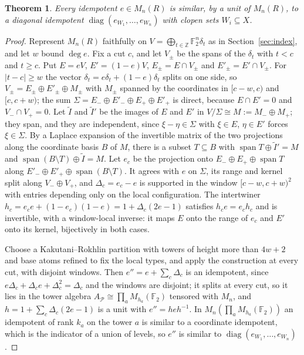 \documentclass[11pt]{amsart}
\newtheorem{theorem}{Theorem}[section]
\theoremstyle{remark}
\newcommand{\F}{\mathbb F}
\newcommand{\Z}{\mathbb Z}
\begin{document}
\begin{theorem}\label{thm:DP}
Every idempotent $e\in M_n(R)$ is similar, by a unit of $M_n(R)$, to a
diagonal idempotent $\operatorname{diag}(e_{W_1},\dots,e_{W_n})$ with
clopen sets $W_i\subseteq X$.
\end{theorem}

\begin{proof}
Represent $M_n(R)$ faithfully on $V=\bigoplus_{t\in\Z}\F_2^n\delta_t$ as in
Section~\ref{sec:index}, and let $w$ bound $\deg e$. Fix a cut $c$, and let
$V_\pm$ be the spans of the $\delta_t$ with $t<c$ and $t\ge c$. Put
$E=eV$, $E'=(1-e)V$, $E_\pm=E\cap V_\pm$ and $E'_\pm=E'\cap V_\pm$. For
$|t-c|\ge w$ the vector $\delta_t=e\delta_t+(1-e)\delta_t$ splits on one
side, so $V_\pm=E_\pm\oplus E'_\pm\oplus M_\pm$ with $M_\pm$ spanned by the
coordinates in $[c-w,c)$ and $[c,c+w)$; the sum
$\Sigma=E_-\oplus E'_-\oplus E_+\oplus E'_+$ is direct, because
$E\cap E'=0$ and $V_-\cap V_+=0$. Let $\tilde I$ and $\tilde I'$ be the
images of $E$ and $E'$ in $V/\Sigma\cong M:=M_-\oplus M_+$; they span, and
they are independent, since $\xi-\eta\in\Sigma$ with $\xi\in E$, $\eta\in E'$
forces $\xi\in\Sigma$. By a Laplace expansion of the invertible matrix of
the two projections along the coordinate basis $B$ of $M$, there is a
subset $T\subseteq B$ with $\operatorname{span}T\oplus\tilde I'=M$ and
$\operatorname{span}(B\setminus T)\oplus\tilde I=M$. Let $e_c$ be the
projection onto $E_-\oplus E_+\oplus\operatorname{span}T$ along
$E'_-\oplus E'_+\oplus\operatorname{span}(B\setminus T)$. It agrees with
$e$ on $\Sigma$, its range and kernel split along $V_-\oplus V_+$, and
$\Delta_c=e_c-e$ is supported in the window $[c-w,c+w)^2$ with entries
depending only on the local configuration. The intertwiner
$h_c=e_ce+(1-e_c)(1-e)=1+\Delta_c(2e-1)$ satisfies $h_ce=e_ch_c$ and is
invertible, with a window-local inverse: it maps $E$ onto the range of
$e_c$ and $E'$ onto its kernel, bijectively in both cases.

Choose a Kakutani--Rokhlin partition with towers of height more than
$4w+2$ and base atoms refined to fix the local types, and apply the
construction at every cut, with disjoint windows. Then $e''=e+\sum_c\Delta_c$
is an idempotent, since $e\Delta_c+\Delta_ce+\Delta_c^2=\Delta_c$ and the
windows are disjoint; it splits at every cut, so it lies in the tower
algebra $A_{\mathcal P}\cong\prod_aM_{h_a}(\F_2)$ tensored with $M_n$, and
$h=1+\sum_c\Delta_c(2e-1)$ is a unit with $e''=heh^{-1}$. In
$M_n(\prod_aM_{h_a}(\F_2))$ an idempotent of rank $k_a$ on the tower $a$ is
similar to a coordinate idempotent, which is the indicator of a union of
levels, so $e''$ is similar to $\operatorname{diag}(e_{W_1},\dots,e_{W_n})$.
\end{proof}
\end{document}
